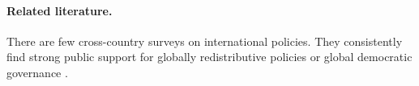 \documentclass[12pt,english]{article}
\begin{document}
\begin{bibunit}

\paragraph{Related literature.} 
There are few cross-country surveys on international policies. They consistently find strong public support for globally redistributive policies \citep{cappelen_majority_2025,fabre_majority_2025} or global democratic governance \citep{ghassim_who_2024}. %



\end{bibunit}
\end{document}
